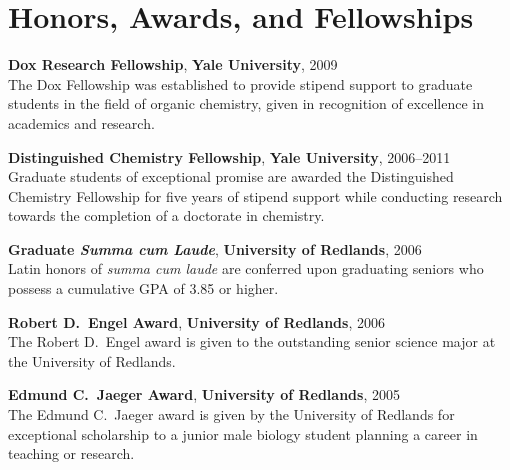 \documentclass[11pt]{article}
\newcommand{\eduitem}[4]{\textbf{#1}, \textbf{#2}, #3\\#4}
\begin{document}

\section{Honors, Awards, and Fellowships}


\eduitem{Dox Research Fellowship}{Yale University}{2009}
{The Dox Fellowship was established to provide stipend support to graduate students 
in the field of organic chemistry, given in recognition of excellence in academics and research.}

\eduitem{Distinguished Chemistry Fellowship}{Yale University}{2006--2011}
{Graduate students of exceptional promise are awarded the Distinguished Chemistry Fellowship for five years of
stipend support while conducting research towards the completion of a doctorate in chemistry.}

\eduitem{Graduate \textit{Summa cum Laude}}{University of Redlands}{2006}
{Latin honors of \textit{summa cum laude} are conferred upon graduating seniors who possess a cumulative 
GPA of 3.85 or higher.}


\eduitem{Robert D.\ Engel Award}{University of Redlands}{2006}
{The Robert D.\ Engel award is given to the outstanding senior 
science major at the University of Redlands.}

\eduitem{Edmund C.\ Jaeger Award}{University of Redlands}{2005}
{The Edmund C.\ Jaeger award is given by the University of Redlands for exceptional scholarship 
to a junior male biology student planning a career in teaching or research.}

\end{document}

